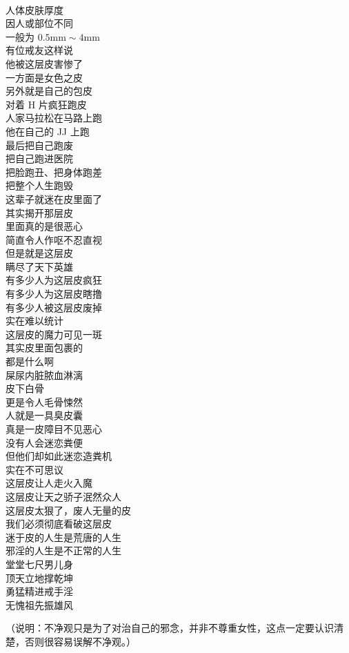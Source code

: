 \begin{poem}[皮之魔]
    \begin{multicols}{3}
        \centering~\\
        人体皮肤厚度 \\ 因人或部位不同 \\ 一般为 $0.5 \unit{\mm} \sim 4 \unit{\mm}$ \\ 有位戒友这样说 \\ 他被这层皮害惨了 \\ 一方面是女色之皮 \\ 另外就是自己的包皮 \\ 对着 H 片疯狂跑皮 \\ 人家马拉松在马路上跑 \\ 他在自己的 JJ 上跑 \\ 最后把自己跑废 \\ 把自己跑进医院 \\ 把脸跑丑、把身体跑差 \\ 把整个人生跑毁 \\ 这辈子就迷在皮里面了 \\ 其实揭开那层皮 \\ 里面真的是很恶心 \\ 简直令人作呕不忍直视 \\ 但是就是这层皮 \\ 瞒尽了天下英雄 \\ 有多少人为这层皮疯狂 \\ 有多少人为这层皮瞎撸 \\ 有多少人被这层皮废掉 \\ 实在难以统计 \\ 这层皮的魔力可见一斑 \\ 其实皮里面包裹的 \\ 都是什么啊 \\ 屎尿内脏脓血淋漓 \\ 皮下白骨 \\ 更是令人毛骨悚然 \\ 人就是一具臭皮囊 \\ 真是一皮障目不见恶心 \\ 没有人会迷恋粪便 \\ 但他们却如此迷恋造粪机 \\ 实在不可思议 \\ 这层皮让人走火入魔 \\ 这层皮让天之骄子泯然众人 \\ 这层皮太狠了，废人无量的皮 \\ 我们必须彻底看破这层皮 \\ 迷于皮的人生是荒唐的人生 \\ 邪淫的人生是不正常的人生 \\ 堂堂七尺男儿身 \\ 顶天立地撑乾坤 \\ 勇猛精进戒手淫 \\ 无愧祖先振雄风
    \end{multicols}
\end{poem}

（说明：不净观只是为了对治自己的邪念，并非不尊重女性，这点一定要认识清楚，否则很容易误解不净观。）
